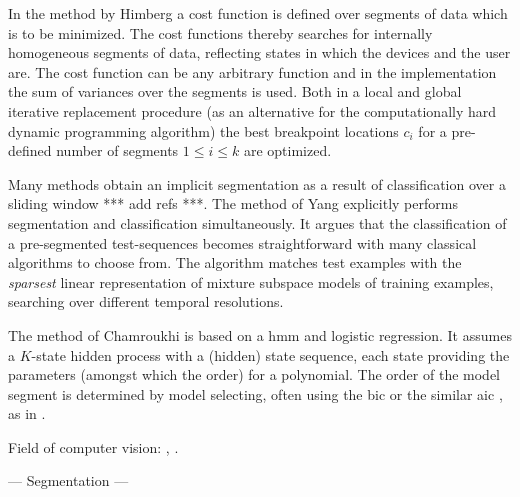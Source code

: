 In the method by Himberg \etal \cite{himberg2001time} a cost function is defined over segments of data which is to be minimized.
The cost functions thereby searches for internally homogeneous segments of data, reflecting states in which the devices and the user are.
The cost function can be any arbitrary function and in the implementation the sum of variances over the segments is used.
Both in a local and global iterative replacement procedure (as an alternative for the computationally hard dynamic programming algorithm) the best breakpoint locations $c_i$ for a pre-defined number of segments $1 \leq i \leq k$ are optimized.

Many methods obtain an implicit segmentation as a result of classification over a sliding window *** add refs ***.
The method of Yang \etal \cite{yang2008distributed} explicitly performs segmentation and classification simultaneously.
It argues that the classification of a pre-segmented test-sequences becomes straightforward with many classical algorithms to choose from.
The algorithm matches test examples with the \emph{sparsest} linear representation of mixture subspace models of training examples, searching over different temporal resolutions.

The method of Chamroukhi \etal \cite{chamroukhi2013joint} is based on a \gls{hmm} and logistic regression.
It assumes a $K$-state hidden process with a (hidden) state sequence, each state providing the parameters (amongst which the order) for a polynomial.
The order of the model segment is determined by model selecting, often using the \gls{bic} or the similar \gls{aic} \cite{akaike1974new}, as in \cite{he2008activity}.

Field of computer vision: \cite{zhou2008aligned}, \cite{li2007segmentation}.

--- Segmentation ---




